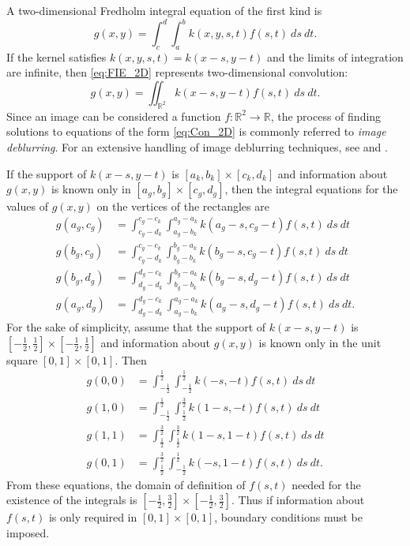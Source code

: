 \documentclass[12pt,notitlepage]{report}
\begin{document}
A two-dimensional Fredholm integral equation of the first kind is
\begin{equation}
g(x,y) = \int_c^d \int_a^b k(x,y,s,t)f(s,t)~ds~dt.
\label{eq:FIE_2D}
\end{equation}
If the kernel satisfies $k(x,y,s,t) = k(x-s,y-t)$ and the limits of integration are infinite, then \eqref{eq:FIE_2D} represents two-dimensional convolution:
\begin{equation}
g(x,y) = \iint_{\mathbb{R}^2} k(x-s,y-t)f(s,t)~ds~dt.
\label{eq:Con_2D}
\end{equation}
Since an image can be considered a function $f : \mathbb{R}^2 \rightarrow \mathbb{R}$, the process of finding solutions to equations of the form \eqref{eq:Con_2D} is commonly referred to \textit{image deblurring}. For an extensive handling of image deblurring techniques, see \cite{HansenNagyOLeary} and \cite[Ch.~5]{Vogel:2002}. \par
If the support of $k(x-s,y-t)$ is $[a_k,b_k] \times [c_k,d_k]$ and information about $g(x,y)$ is known only in $[a_g,b_g] \times [c_g,d_g]$, then the integral equations for the values of $g(x,y)$ on the vertices of the rectangles are
\begin{align*}
g(a_g,c_g) &= \int_{c_g-d_k}^{c_g-c_k} \int_{a_g-b_k}^{a_g-a_k} k(a_g-s,c_g-t)f(s,t)~ds~dt \\
g(b_g,c_g) &= \int_{c_g-d_k}^{c_g-c_k} \int_{b_g-b_k}^{b_g-a_k} k(b_g-s,c_g-t)f(s,t)~ds~dt \\
g(b_g,d_g) &= \int_{d_g-d_k}^{d_g-c_k} \int_{b_g-b_k}^{b_g-a_k} k(b_g-s,d_g-t)f(s,t)~ds~dt \\
g(a_g,d_g) &= \int_{d_g-d_k}^{d_g-c_k} \int_{a_g-b_k}^{a_g-a_k} k(a_g-s,d_g-t)f(s,t)~ds~dt.
\end{align*}
For the sake of simplicity, assume that the support of $k(x-s,y-t)$ is $[-\frac{1}{2},\frac{1}{2}] \times [-\frac{1}{2},\frac{1}{2}]$ and information about $g(x,y)$ is known only in the unit square $[0,1] \times [0,1]$. Then
\begin{align*}
g(0,0) &= \int_{-\frac{1}{2}}^{\frac{1}{2}} \int_{-\frac{1}{2}}^{\frac{1}{2}} k(-s,-t)f(s,t)~ds~dt \\
g(1,0) &= \int_{-\frac{1}{2}}^{\frac{1}{2}} \int_{\frac{1}{2}}^{\frac{3}{2}} k(1-s,-t)f(s,t)~ds~dt \\
g(1,1) &= \int_{\frac{1}{2}}^{\frac{3}{2}} \int_{\frac{1}{2}}^{\frac{3}{2}} k(1-s,1-t)f(s,t)~ds~dt \\
g(0,1) &= \int_{\frac{1}{2}}^{\frac{3}{2}} \int_{-\frac{1}{2}}^{\frac{1}{2}} k(-s,1-t)f(s,t)~ds~dt.
\end{align*}
From these equations, the domain of definition of $f(s,t)$ needed for the existence of the integrals is $[-\frac{1}{2},\frac{3}{2}] \times [-\frac{1}{2},\frac{3}{2}]$. Thus if information about $f(s,t)$ is only required in $[0,1] \times [0,1]$, boundary conditions must be imposed.
\end{document}
